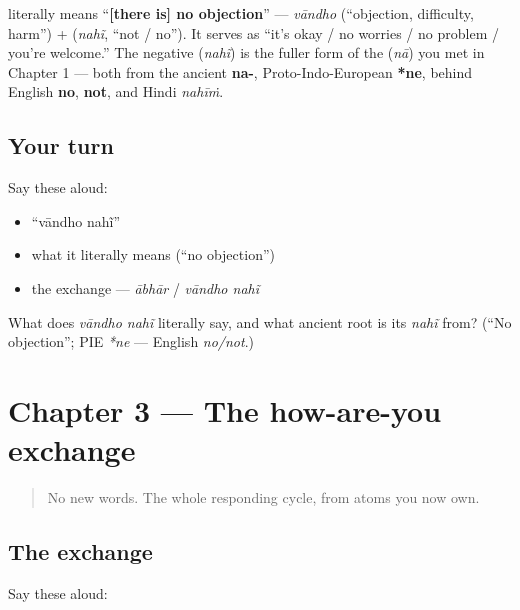 \begin{cousinweb}
\textbf{ } literally means \textquotedblleft{}\textbf{{[}there is{]} no objection}\textquotedblright{} — \emph{vāndho} (\textquotedblleft{}objection, difficulty, harm\textquotedblright{}) + \textbf{} (\emph{nahĩ}, \textquotedblleft{}not / no\textquotedblright{}). It serves as \textquotedblleft{}it's okay / no worries / no problem / you're welcome.\textquotedblright{} The negative \textbf{} (\emph{nahĩ}) is the fuller form of the \textbf{} (\emph{nā}) you met in Chapter 1 — both from the ancient \textbf{na-}, Proto-Indo-European \textbf{*ne}, behind English \textbf{no}, \textbf{not}, and Hindi \emph{nahīṁ}.
\end{cousinweb}

\subsection*{Your turn}
Say these aloud:

\begin{itemize}
\raggedright
  \item \textquotedblleft{}vāndho nahĩ\textquotedblright{}
  \item what it literally means (\textquotedblleft{}no objection\textquotedblright{})
  \item the exchange — \emph{ābhār} / \emph{vāndho nahĩ}
\end{itemize}

\begin{tcolorbox}[breakable,colback=teal!4,colframe=teal!35!black,title={Before you move on}]
What does \emph{vāndho nahĩ} literally say, and what ancient root is its \emph{nahĩ} from? (\textquotedblleft{}No objection\textquotedblright{}; PIE \emph{*ne} — English \emph{no/not}.)
\end{tcolorbox}
\section[Practice]{Chapter 3 — The how-are-you exchange}

\label{lesson:GU-C03-practice}



\begin{quote}
No new words. The whole responding cycle, from atoms you now own.
\end{quote}

\subsection*{The exchange}
Say these aloud:

